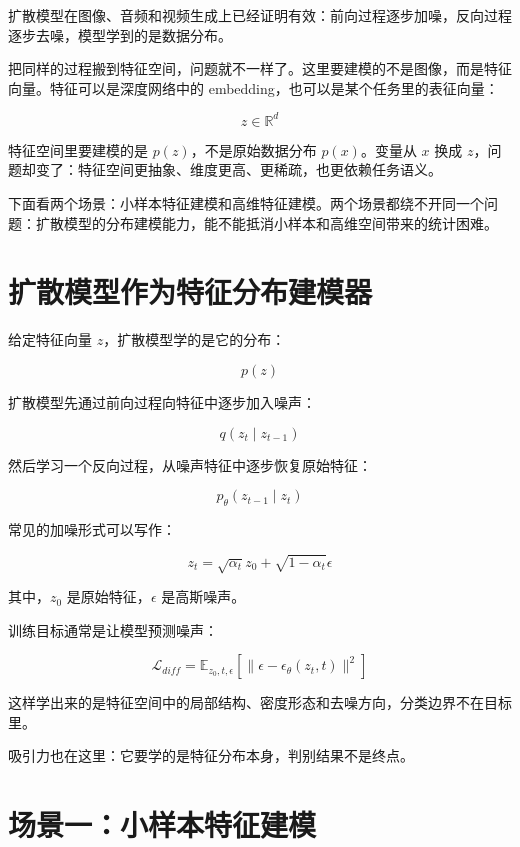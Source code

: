 扩散模型在图像、音频和视频生成上已经证明有效：前向过程逐步加噪，反向过程逐步去噪，模型学到的是数据分布。

把同样的过程搬到特征空间，问题就不一样了。这里要建模的不是图像，而是特征向量。特征可以是深度网络中的 embedding，也可以是某个任务里的表征向量：

\[
z \in \mathbb{R}^{d}
\]

特征空间里要建模的是 \(p(z)\)，不是原始数据分布 \(p(x)\)。变量从 \(x\) 换成 \(z\)，问题却变了：特征空间更抽象、维度更高、更稀疏，也更依赖任务语义。

下面看两个场景：小样本特征建模和高维特征建模。两个场景都绕不开同一个问题：扩散模型的分布建模能力，能不能抵消小样本和高维空间带来的统计困难。

\section{扩散模型作为特征分布建模器}

给定特征向量 \(z\)，扩散模型学的是它的分布：

\[
p(z)
\]

扩散模型先通过前向过程向特征中逐步加入噪声：

\[
q(z_t \mid z_{t-1})
\]

然后学习一个反向过程，从噪声特征中逐步恢复原始特征：

\[
p_\theta(z_{t-1} \mid z_t)
\]

常见的加噪形式可以写作：

\[
z_t = \sqrt{\alpha_t}z_0 + \sqrt{1-\alpha_t}\epsilon
\]

其中，\(z_0\) 是原始特征，\(\epsilon\) 是高斯噪声。

训练目标通常是让模型预测噪声：

\[
\mathcal{L}_{diff} =
\mathbb{E}_{z_0,t,\epsilon}
\left[
\|\epsilon - \epsilon_{\theta}(z_t,t)\|^2
\right]
\]

这样学出来的是特征空间中的局部结构、密度形态和去噪方向，分类边界不在目标里。

吸引力也在这里：它要学的是特征分布本身，判别结果不是终点。

\section{场景一：小样本特征建模}


